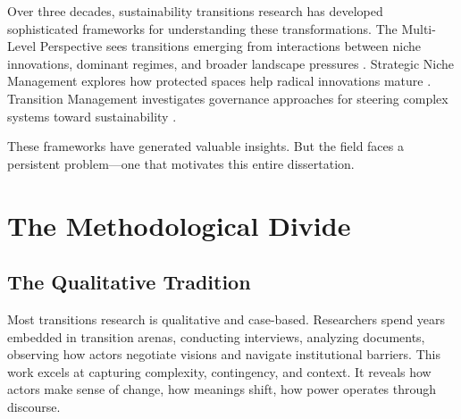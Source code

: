 \documentclass[../main.tex]{subfiles}
\begin{document}
Over three decades, sustainability transitions research has developed sophisticated frameworks for understanding these transformations. The Multi-Level Perspective sees transitions emerging from interactions between niche innovations, dominant regimes, and broader landscape pressures . Strategic Niche Management explores how protected spaces help radical innovations mature \cite{smith2007snm}. Transition Management investigates governance approaches for steering complex systems toward sustainability \cite{kemp2007tm}.

These frameworks have generated valuable insights. But the field faces a persistent problem---one that motivates this entire dissertation.

\begin{center}
\label{fig:intro:depth-breadth}
\end{center}

\section{The Methodological Divide}
\label{sec:intro:divide}

\subsection{The Qualitative Tradition}

Most transitions research is qualitative and case-based. Researchers spend years embedded in transition arenas, conducting interviews, analyzing documents, observing how actors negotiate visions and navigate institutional barriers. This work excels at capturing complexity, contingency, and context. It reveals how actors make sense of change, how meanings shift, how power operates through discourse.
\end{document}
